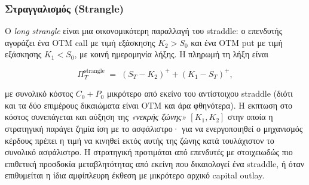 \documentclass[12pt]{article}
\begin{document}
\subsubsection{Στραγγαλισμός (Strangle)}

Ο \emph{long strangle} είναι μια οικονομικότερη παραλλαγή του straddle: ο επενδυτής αγοράζει ένα OTM call με τιμή εξάσκησης $K_2 > S_0$ και ένα OTM put με τιμή εξάσκησης $K_1 < S_0$, με κοινή ημερομηνία λήξης. Η πληρωμή τη λήξη είναι

$$
\Pi^{\text{strangle}}_T \;=\; (S_T - K_2)^+ + (K_1 - S_T)^+ ,
$$

με συνολικό κόστος $C_0 + P_0$ μικρότερο από εκείνο του αντίστοιχου straddle (διότι και τα δύο επιμέρους δικαιώματα είναι OTM και άρα φθηνότερα). Η εκπτωση στο κόστος συνεπάγεται και αύξηση της \emph{«νεκρής ζώνης»} $[K_1, K_2]$ στην οποία η στρατηγική παράγει ζημία ίση με το ασφάλιστρο· για να ενεργοποιηθεί ο μηχανισμός κέρδους πρέπει η τιμή να κινηθεί εκτός αυτής της ζώνης κατά τουλάχιστον το συνολικό ασφάλιστρο. Η στρατηγική προτιμάται από επενδυτές με στοιχειωδώς πιο επιθετική προσδοκία μεταβλητότητας από εκείνη που δικαιολογεί ένα straddle, ή όταν επιθυμείται η ίδια αμφίπλευρη έκθεση με μικρότερο αρχικό capital outlay.
\end{document}
